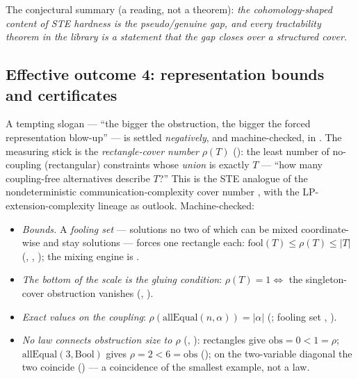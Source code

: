 \documentclass[11pt]{article}
\newcommand{\rectrho}{\rho}
\newcommand{\obs}{\mathrm{obs}}
\begin{document}
\noindent The conjectural summary (a reading, not a theorem):
\emph{the cohomology-shaped content of STE hardness is the
pseudo/genuine gap, and every tractability theorem in the library is
a statement that the gap closes over a structured cover.}

\subsection{Effective outcome 4: representation bounds and
certificates}
\label{sec:quant-sub}

A tempting slogan --- ``the bigger the obstruction, the bigger the
forced representation blow-up'' --- is settled \emph{negatively}, and
machine-checked, in .  The measuring
stick is the \emph{rectangle-cover number} $\rectrho(T)$
(): the least number of no-coupling
(rectangular) constraints whose \emph{union} is exactly $T$ --- ``how
many coupling-free alternatives describe $T$?''  This is the STE
analogue of the nondeterministic communication-complexity cover
number \citep{kushilevitz1997communication,aho1983notions}, with the
LP-extension-complexity lineage
\citep{yannakakis1991expressing,fiorini2015exponential} as outlook.
Machine-checked:

\begin{itemize}
\item \emph{Bounds.}  A \emph{fooling set} --- solutions no two of
  which can be mixed coordinate-wise and stay solutions --- forces
  one rectangle each: $\mathrm{fool}(T) \le \rectrho(T) \le |T|$
  (,
  ,
  ); the mixing engine is
  .
\item \emph{The bottom of the scale is the gluing condition}:
  $\rectrho(T) = 1 \iff$ the singleton-cover obstruction vanishes
  (,
  ).
\item \emph{Exact values on the coupling}:
  $\rectrho(\mathrm{allEqual}(n,\alpha)) = |\alpha|$
  (; fooling set
  , ).
\item \emph{No law connects obstruction size to $\rectrho$}
  (,
  ): rectangles
  give $\obs = 0 < 1 = \rectrho$; $\mathrm{allEqual}(3,
  \mathrm{Bool})$ gives $\rectrho = 2 < 6 = \obs$
  (); on the
  two-variable diagonal the two coincide
  () --- a
  coincidence of the smallest example, not a law.
\end{itemize}
\end{document}
